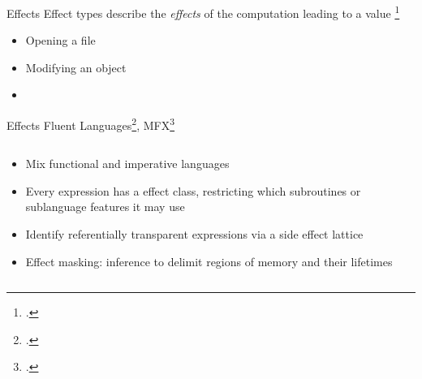 \documentclass[aspectratio=169]{beamer}
\begin{document}
\begin{frame}{Effects}
    Effect types describe the \emph{effects} of the computation leading to a value \footcite{pierce_advanced_2005}
    \\
    \begin{itemize} %
        \item Opening a file
        \item Modifying an object
        \item {}
    \end{itemize}
\end{frame}

\begin{frame}{Effects}
    Fluent Languages\footcite{gifford_integrating_1986}, MFX\footcite{lucassen_polymorphic_1988}
  \begin{columns}[T]
    \begin{column}{0.68\textwidth}
        \begin{itemize}[<+->]
            \item Mix functional and imperative languages 
            \item Every expression has a \alert{effect class}, restricting which subroutines or sublanguage features it may use
            \item Identify \alert{referentially transparent} expressions via a side effect lattice 
            \item Effect masking: inference to delimit regions of memory and their lifetimes
        \end{itemize}
    \end{column}

    \pause

    \begin{column}{0.30\textwidth}
    \vspace{-0.2in}
    \footnotesize{

}
\end{column}
\end{columns}
\end{frame}
\end{document}
